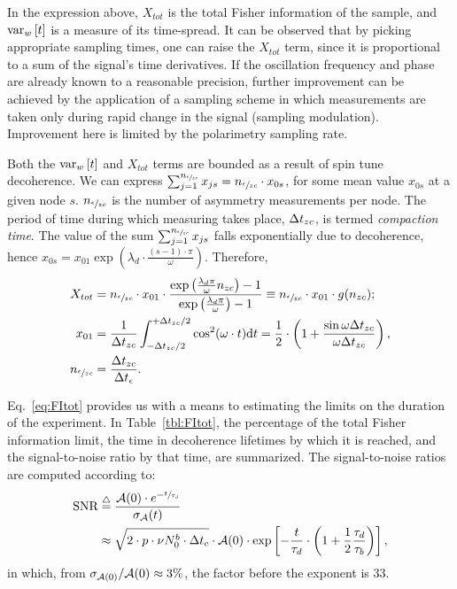 \documentclass[a4paper]{jacow}
\newcommand{\td}{\mathrm{d}}
\newcommand{\cnt}{c}
\newcommand{\meas}{\epsilon}
\newcommand{\dt}{\Delta t}
\newcommand{\dtm}{\dt_{\meas}}
\newcommand{\dtc}{\dt_{\cnt}}
\newcommand{\Nmnd}{{n_{\sfrac{\meas}{zc}}}}
\newcommand{\Nnd}{{n_{zc}}}
\newcommand{\LTb}{\tau_b}
\newcommand{\LTd}{\tau_d}
\newcommand{\lamd}{\lambda_d}
\begin{document}
In the expression above, $X_{tot}$ is the total Fisher information of the sample, and $\var[w]{t}$ is a measure of its time-spread. It can be observed that by picking appropriate sampling times, one can raise the $X_{tot}$ term, since it is proportional to a sum of the signal's time derivatives. If the oscillation frequency and phase are already known to a reasonable precision, further improvement can be achieved by the application of a sampling scheme in which measurements are taken only during rapid change in the signal (sampling modulation). Improvement here is limited by the polarimetry sampling rate.

Both the $\var[w]{t}$ and $X_{tot}$ terms are bounded as a result of spin tune decoherence. We can express $\sum_{j=1}^{\Nmnd} x_{js} = \Nmnd \cdot x_{0s}$, for some mean value $x_{0s}$ at a given node $s$. $\Nmnd$ is the number of asymmetry measurements per node. The period of time during which measuring takes place, $\dtnd$, is termed \textit{compaction time}. The value of the sum $\sum_{j=1}^{\Nmnd} x_{js}$ falls exponentially due to decoherence, hence $x_{0s} = x_{01}\exp{(\lamd\cdot \frac{(s-1)\cdot\pi}{\omega})}$. Therefore,
\begin{align}
	X_{tot} & = \Nmnd\cdot x_{01} \cdot \frac{\exp{\bkt{\frac{\lamd\pi}{\omega}\Nnd}}-1}{\exp{\bkt{\frac{\lamd\pi}{\omega}}}-1} 
	\equiv \Nmnd \cdot x_{01}\cdot g(\Nnd); \label{eq:FItot}\\
	x_{01}  & = \frac{1}{\dtnd}\int_{-\dtnd/2}^{+\dtnd/2}\cos^2(\omega\cdot t)\td t = \frac12\cdot \bkt{1 + \frac{\sin\omega\dtnd}{\omega\dtnd}},                                    \label{eq:MeanFIZC}   \\
	\Nmnd   & = \frac{\dtnd}{\dtm}. \label{eq:NumMeasNode}
\end{align}

Eq.~\eqref{eq:FItot} provides us with a means to estimating the limits on the duration of the experiment. In Table~\ref{tbl:FItot}, the percentage of the total Fisher information limit, the time in decoherence lifetimes by which it is reached, and the signal-to-noise ratio by that time, are summarized. The signal-to-noise ratios are computed according to:
\begin{align}
\SNR &\deq \frac{\Asym(0)\cdot e^{-\sfrac{t}{\LTd}}}{\SD{\Asym}(t)} \notag\\
	 &\approx \sqrt{2\cdot p\cdot\nu N_0^b\cdot \dtc}\cdot \Asym(0)\cdot \exp\bkt*{-\frac{t}{\LTd}\cdot\bkt{1+\frac12\frac{\LTd}{\LTb}}},\label{eq:TauRatioSNR}
\end{align}
in which, from $\SD{\Asym(0)}/\Asym(0) \approx 3\%$, the factor before the exponent is 33.
\end{document}
